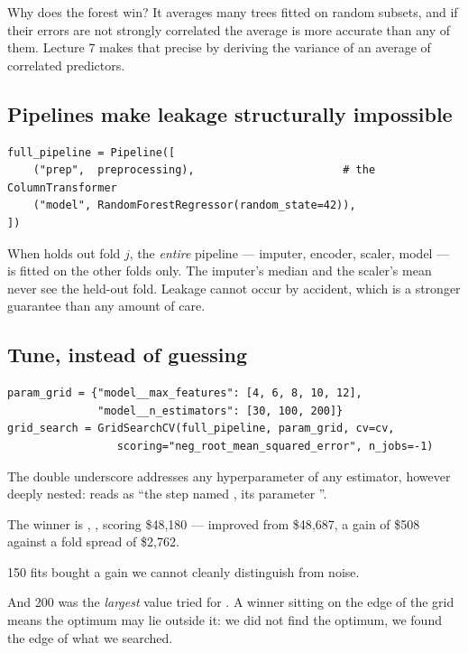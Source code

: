 \documentclass[11pt,a4paper]{article}
\begin{document}
Why does the forest win? It averages many trees fitted on random subsets, and
if their errors are not strongly correlated the average is more accurate than
any of them. Lecture 7 makes that precise by deriving the variance of an
average of correlated predictors.

\subsection{Pipelines make leakage structurally impossible}

\begin{center}
\small
\begin{verbatim}
full_pipeline = Pipeline([
    ("prep",  preprocessing),                       # the ColumnTransformer
    ("model", RandomForestRegressor(random_state=42)),
])
\end{verbatim}
\end{center}

When  holds out fold $j$, the \emph{entire} pipeline
--- imputer, encoder, scaler, model --- is fitted on the other folds only. The
imputer's median and the scaler's mean never see the held-out fold. Leakage
cannot occur by accident, which is a stronger guarantee than any amount of
care.

\subsection{Tune, instead of guessing}

\begin{center}
\small
\begin{verbatim}
param_grid = {"model__max_features": [4, 6, 8, 10, 12],
              "model__n_estimators": [30, 100, 200]}
grid_search = GridSearchCV(full_pipeline, param_grid, cv=cv,
                 scoring="neg_root_mean_squared_error", n_jobs=-1)
\end{verbatim}
\end{center}

The double underscore addresses any hyperparameter of any estimator, however
deeply nested:  reads as ``the step named
, its parameter ''.

The winner is , , scoring
\$48{,}180 --- improved from \$48{,}687, a gain of \$508 against a fold spread
of \$2{,}762.

\begin{failbox}[title={Failure condition --- two things to notice, and neither is the improvement}]
150 fits bought a gain we cannot cleanly distinguish from noise.

And 200 was the \emph{largest} value tried for . A winner
sitting on the edge of the grid means the optimum may lie outside it: we did
not find the optimum, we found the edge of what we searched.
\end{failbox}
\end{document}

